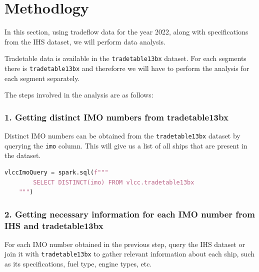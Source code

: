 \section{Methodlogy}


In this section, using tradeflow data for the year 2022, along with specifications from the IHS dataset, we will perform data analysis.

Tradetable data is available in the \texttt{tradetable13bx} dataset. For each segments there is \texttt{tradetable13bx} and thereforre we will have to perform the analysis for each segment separately.

The steps involved in the analysis are as follows:

\newpage

\subsubsection{1. Getting distinct IMO numbers from tradetable13bx}

Distinct IMO numbers can be obtained from the \texttt{tradetable13bx} dataset by querying the \texttt{imo} column.
This will give us a list of all ships that are present in the dataset.

\begin{lstlisting}[language=python, caption=SQL Query to get distinct IMO]
    vlccImoQuery = spark.sql(f"""
        SELECT DISTINCT(imo) FROM vlcc.tradetable13bx
    """)
\end{lstlisting}

\subsubsection{2. Getting necessary information for each IMO number from IHS and tradetable13bx}
For each IMO number obtained in the previous step,
query the IHS dataset or join it with \texttt{tradetable13bx} to gather relevant information about each ship, such as its specifications, fuel type, engine types, etc.



